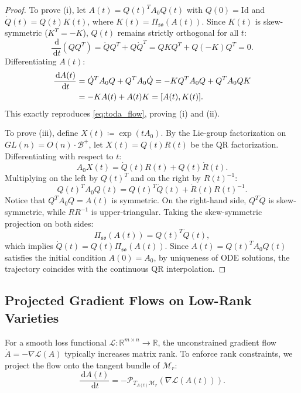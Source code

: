 \documentclass[11pt,a4paper,reqno]{amsart}
\theoremstyle{definition}
\numberwithin{equation}{section}
\providecommand{\R}{\mathbb{R}}
\newcommand{\Id}{\mathrm{Id}}
\newcommand{\dif}{\,\mathrm{d}}
\providecommand{\R}{\mathbb{R}}
\begin{document}
\begin{proof}
To prove (i), let $A(t) = Q(t)^T A_0 Q(t)$ with $Q(0) = \Id$ and $\dot{Q}(t) = Q(t) K(t)$, where $K(t) = \Pi_{\mathfrak{so}}(A(t))$. Since $K(t)$ is skew-symmetric ($K^T = -K$), $Q(t)$ remains strictly orthogonal for all $t$:
\begin{equation}
    \frac{\dif}{\dif t}(Q Q^T) = \dot{Q} Q^T + Q \dot{Q}^T = Q K Q^T + Q (-K) Q^T = 0.
\end{equation}
Differentiating $A(t)$:
\begin{align}
    \frac{\dif A(t)}{\dif t} &= \dot{Q}^T A_0 Q + Q^T A_0 \dot{Q} = -K Q^T A_0 Q + Q^T A_0 Q K \notag \\
    &= -K A(t) + A(t) K = [A(t), K(t)].
\end{align}
This exactly reproduces \eqref{eq:toda_flow}, proving (i) and (ii).

To prove (iii), define $X(t) \coloneqq \exp(t A_0)$. By the Lie-group factorization on $GL(n) = O(n) \cdot \mathcal{B}^+$, let $X(t) = Q(t) R(t)$ be the QR factorization. Differentiating with respect to $t$:
\begin{equation}
    A_0 X(t) = \dot{Q}(t) R(t) + Q(t) \dot{R}(t).
\end{equation}
Multiplying on the left by $Q(t)^T$ and on the right by $R(t)^{-1}$:
\begin{equation}
    Q(t)^T A_0 Q(t) = Q(t)^T \dot{Q}(t) + \dot{R}(t) R(t)^{-1}.
\end{equation}
Notice that $Q^T A_0 Q = A(t)$ is symmetric. On the right-hand side, $Q^T \dot{Q}$ is skew-symmetric, while $\dot{R} R^{-1}$ is upper-triangular. Taking the skew-symmetric projection on both sides:
\begin{equation}
    \Pi_{\mathfrak{so}}(A(t)) = Q(t)^T \dot{Q}(t),
\end{equation}
which implies $\dot{Q}(t) = Q(t) \Pi_{\mathfrak{so}}(A(t))$. Since $A(t) = Q(t)^T A_0 Q(t)$ satisfies the initial condition $A(0) = A_0$, by uniqueness of ODE solutions, the trajectory coincides with the continuous QR interpolation.
\end{proof}

\subsection{Projected Gradient Flows on Low-Rank Varieties}
For a smooth loss functional $\mathcal{L} \colon \R^{m \times n} \to \R$, the unconstrained gradient flow $\dot{A} = -\nabla \mathcal{L}(A)$ typically increases matrix rank. To enforce rank constraints, we project the flow onto the tangent bundle of $\mathcal{M}_r$:
\begin{equation}
    \label{eq:projected_flow}
    \frac{\dif A(t)}{\dif t} = -\mathcal{P}_{T_{A(t)} \mathcal{M}_r}(\nabla \mathcal{L}(A(t))).
\end{equation}
\end{document}
